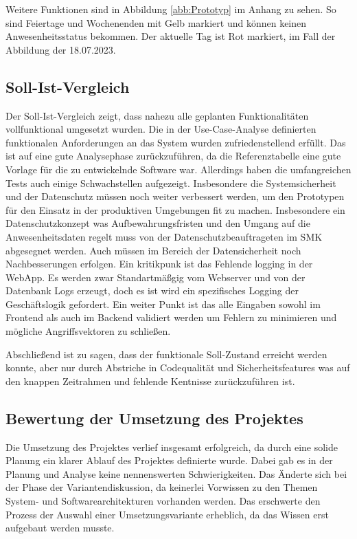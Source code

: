 Weitere Funktionen sind in Abbildung \ref{abb:Prototyp} im Anhang zu sehen. So sind \zB Feiertage und Wochenenden mit Gelb markiert und können keinen Anwesenheitsstatus bekommen. Der aktuelle Tag ist Rot markiert, im Fall der Abbildung der 18.07.2023.

\subsection{Soll-Ist-Vergleich}
\label{sec:Soll-Ist-Vergleich}
Der Soll-Ist-Vergleich zeigt, dass nahezu alle geplanten Funktionalitäten vollfunktional umgesetzt wurden. Die in der Use-Case-Analyse definierten funktionalen Anforderungen an das System wurden zufriedenstellend erfüllt. Das ist auf eine gute Analysephase zurückzuführen, da die Referenztabelle eine gute Vorlage für die zu entwickelnde Software war. Allerdings haben die umfangreichen Tests auch einige Schwachstellen aufgezeigt. Insbesondere die Systemsicherheit und der Datenschutz müssen noch weiter verbessert werden, um den Prototypen für den Einsatz in der produktiven Umgebungen fit zu machen. Insbesondere ein Datenschutzkonzept was Aufbewahrungsfristen und den Umgang auf die Anwesenheitsdaten regelt muss von der Datenschutzbeauftrageten im SMK abgesegnet werden. Auch müssen im Bereich der Datensicherheit noch Nachbesserungen erfolgen. Ein kritikpunk ist \zB das Fehlende logging in der WebApp. Es werden zwar Standartmäßgig vom Webserver und von der Datenbank Logs erzeugt, doch es ist wird ein spezifisches Logging der Geschäftslogik gefordert. Ein weiter Punkt ist das alle Eingaben sowohl im Frontend als auch im Backend validiert werden um Fehlern zu minimieren und mögliche Angriffsvektoren zu schließen.

Abschließend ist zu sagen, dass der funktionale Soll-Zustand erreicht werden konnte, aber nur durch Abstriche in Codequalität und Sicherheitsfeatures was auf den knappen Zeitrahmen und fehlende Kentnisse zurückzuführen ist.

\subsection{Bewertung der Umsetzung des Projektes}
\label{sec:Bewertung} %
Die Umsetzung des Projektes verlief insgesamt erfolgreich, da durch eine solide Planung ein klarer Ablauf des Projektes definierte wurde. Dabei gab es in der Planung und Analyse keine nennenswerten Schwierigkeiten. Das Änderte sich bei der Phase der Variantendiskussion, da keinerlei Vorwissen zu den Themen System- und Softwarearchitekturen vorhanden werden. Das erschwerte den Prozess der Auswahl einer Umsetzungsvariante erheblich, da das Wissen erst aufgebaut werden musste.

